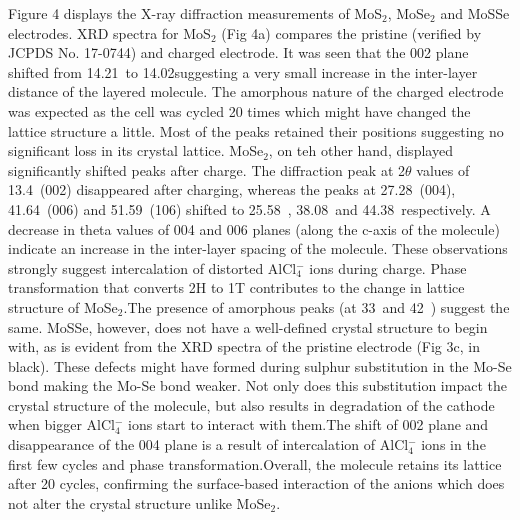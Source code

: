 \documentclass[num-refs]{wiley-article}
\begin{document}
Figure 4 displays the X-ray diffraction measurements of MoS$_2$, MoSe$_2$ and MoSSe electrodes. XRD spectra for MoS$_2$ (Fig 4a) compares the pristine (verified by JCPDS No. 17-0744) and charged electrode. It was seen that the 002 plane shifted from 14.21\degree\  to 14.02\degree suggesting a very small increase in the inter-layer distance of the layered molecule. The amorphous nature of the charged electrode was expected as the cell was cycled 20 times which might have changed the lattice structure a little. Most of the peaks retained their positions suggesting no significant loss in its crystal lattice. MoSe$_2$, on teh other hand, displayed significantly shifted peaks after charge. The diffraction peak at 2$\theta$ values of 13.4\degree\ (002) disappeared after charging, whereas the peaks at  27.28\degree\ (004), 41.64\degree\ (006) and 51.59\degree\ (106) shifted to 25.58\degree\ , 38.08\degree\  and 44.38\degree\ respectively. A decrease in theta values of 004 and 006 planes (along the c-axis of the molecule) indicate an increase in the inter-layer spacing of the molecule. These observations strongly suggest intercalation of distorted AlCl$_4^-$ ions during charge. Phase transformation that converts 2H to 1T contributes to the change in lattice structure of MoSe$_2$.The presence of amorphous peaks (at 33\degree\ and 42\degree\ ) suggest the same. MoSSe, however, does not have a well-defined crystal structure to begin with, as is evident from the XRD spectra of the pristine electrode (Fig 3c, in black). These defects might have formed during sulphur substitution in the Mo-Se bond making the Mo-Se bond weaker. Not only does this substitution impact the crystal structure of the molecule, but also results in degradation of the cathode when bigger AlCl$_4^-$ ions start to interact with them.The shift of 002 plane and disappearance of the 004 plane is a result of intercalation of AlCl$_4^-$ ions in the first few cycles and phase transformation.Overall, the molecule retains its lattice after 20 cycles, confirming the surface-based interaction of the anions which does not alter the crystal structure unlike MoSe$_2$. 
\end{document}
